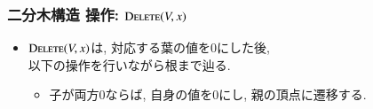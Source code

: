 \documentclass[main]{subfiles}
\begin{document}
\begin{frame}\frametitle{二分木構造 操作: $\mathrm{\text{D\textsc{elete}}}(V,x)$}
\begin{itemize}
\item $\mathrm{\text{D\textsc{elete}}}(V,x)$は, 対応する葉の値を$0$にした後, \\以下の操作を行いながら根まで辿る.
\begin{itemize} \item 子が両方$0$ならば, 自身の値を$0$にし, 親の頂点に遷移する. \end{itemize}
\end{itemize}
 

\end{frame}
\end{document}
